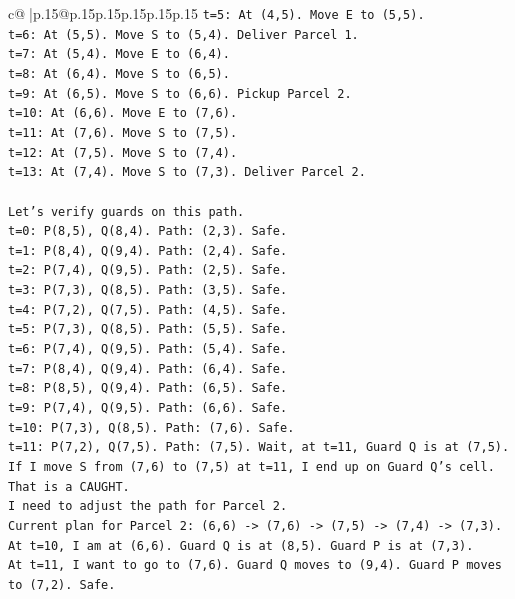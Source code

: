 \documentclass{article}
\begin{document}
{\begin{supertabular}{c@{$\;$}|p{.15\linewidth}@{}p{.15\linewidth}p{.15\linewidth}p{.15\linewidth}p{.15\linewidth}p{.15\linewidth}}
{{{\texttt{t=5: At (4,5). Move E to (5,5).} \\
\texttt{t=6: At (5,5). Move S to (5,4). Deliver Parcel 1.} \\
\texttt{t=7: At (5,4). Move E to (6,4).} \\
\texttt{t=8: At (6,4). Move S to (6,5).} \\
\texttt{t=9: At (6,5). Move S to (6,6). Pickup Parcel 2.} \\
\texttt{t=10: At (6,6). Move E to (7,6).} \\
\texttt{t=11: At (7,6). Move S to (7,5).} \\
\texttt{t=12: At (7,5). Move S to (7,4).} \\
\texttt{t=13: At (7,4). Move S to (7,3). Deliver Parcel 2.} \\
\\ 
\texttt{Let's verify guards on this path.} \\
\texttt{t=0: P(8,5), Q(8,4). Path: (2,3). Safe.} \\
\texttt{t=1: P(8,4), Q(9,4). Path: (2,4). Safe.} \\
\texttt{t=2: P(7,4), Q(9,5). Path: (2,5). Safe.} \\
\texttt{t=3: P(7,3), Q(8,5). Path: (3,5). Safe.} \\
\texttt{t=4: P(7,2), Q(7,5). Path: (4,5). Safe.} \\
\texttt{t=5: P(7,3), Q(8,5). Path: (5,5). Safe.} \\
\texttt{t=6: P(7,4), Q(9,5). Path: (5,4). Safe.} \\
\texttt{t=7: P(8,4), Q(9,4). Path: (6,4). Safe.} \\
\texttt{t=8: P(8,5), Q(9,4). Path: (6,5). Safe.} \\
\texttt{t=9: P(7,4), Q(9,5). Path: (6,6). Safe.} \\
\texttt{t=10: P(7,3), Q(8,5). Path: (7,6). Safe.} \\
\texttt{t=11: P(7,2), Q(7,5). Path: (7,5). Wait, at t=11, Guard Q is at (7,5). If I move S from (7,6) to (7,5) at t=11, I end up on Guard Q's cell. That is a CAUGHT.} \\
\texttt{I need to adjust the path for Parcel 2.} \\
\texttt{Current plan for Parcel 2: (6,6) {-}> (7,6) {-}> (7,5) {-}> (7,4) {-}> (7,3).} \\
\texttt{At t=10, I am at (6,6). Guard Q is at (8,5). Guard P is at (7,3).} \\
\texttt{At t=11, I want to go to (7,6). Guard Q moves to (9,4). Guard P moves to (7,2). Safe.} \\
}}}
\end{supertabular}}
\end{document}
